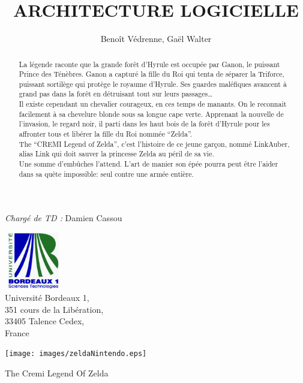 \documentclass[a4paper,11pt]{article}
\title{\large{\bfseries{ARCHITECTURE LOGICIELLE}}}
\author{Beno\^it V\'edrenne, Gaël Walter}
\begin{document}
\maketitle

\begin{center}
\emph{Charg\'e de TD :} Damien Cassou\end{center}

\vspace{0.5cm}

\begin{center}
\includegraphics[width=2.5cm,height=2.5cm]{images/bdx1.eps}\\
\large{Universit\'e Bordeaux 1,\\
351 cours de la Lib\'eration,\\
33405 Talence Cedex,\\
France}
\end{center} 

\vspace{0cm}

\begin{center}
 \texttt{[image: images/zeldaNintendo.eps]}
\end{center}

\begin{center}
 \large{The Cremi Legend Of Zelda}
\end{center}

\begin{abstract}
La l\'egende raconte que la grande for\^et d'Hyrule est occup\'ee par Ganon, le
puissant Prince des T\'en\`ebres. Ganon a captur\'e la fille du Roi qui tenta de s\'eparer la
Triforce, puissant sortil\`ege qui prot\`ege le royaume d'Hyrule. Ses guardes
mal\'efiques avancent \`a grand pas dans la for\^et en d\'etruisant tout sur leurs
passages\ldots \\
Il existe cependant un chevalier courageux, en ces temps de manants. 
On le reconnait facilement \`a sa chevelure blonde sous sa longue cape
verte. Apprenant la nouvelle de l'invasion, le regard noir,
il parti dans les haut bois de la for\^et d'Hyrule pour les affronter tous et
lib\'erer la fille du Roi nomm\'ee ``Zelda''.\\

The ``CREMI Legend of Zelda'', c'est l'histoire de ce jeune garçon, nomm\'e
LinkAuber, alias Link qui doit sauver la princesse Zelda au p\'eril de sa vie. \\
Une somme d'embûches l'attend. L'art de manier son \'ep\'ee pourra peut \^etre
l'aider dans sa qu\^ete impossible: seul contre une arm\'ee enti\`ere.
\end{abstract}
\end{document}
